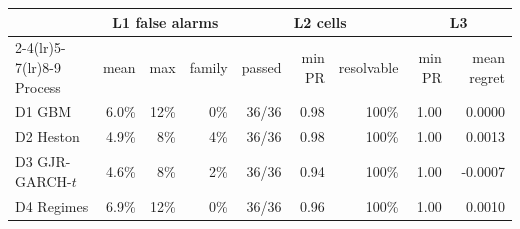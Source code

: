 \begin{tabular}{lrrrrrrrr}
\toprule
& \multicolumn{3}{c}{L1 false alarms} & \multicolumn{3}{c}{L2 cells} & \multicolumn{2}{c}{L3} \\
\cmidrule(lr){2-4}\cmidrule(lr){5-7}\cmidrule(lr){8-9}
Process & mean & max & family & passed & min PR & resolvable & min PR & mean regret \\
\midrule
D1 GBM & 6.0\% & 12\% & 0\% & 36/36 & 0.98 & 100\% & 1.00 & 0.0000 \\
D2 Heston & 4.9\% & 8\% & 4\% & 36/36 & 0.98 & 100\% & 1.00 & 0.0013 \\
D3 GJR-GARCH-$t$ & 4.6\% & 8\% & 2\% & 36/36 & 0.94 & 100\% & 1.00 & -0.0007 \\
D4 Regimes & 6.9\% & 12\% & 0\% & 36/36 & 0.96 & 100\% & 1.00 & 0.0010 \\
\bottomrule
\end{tabular}
